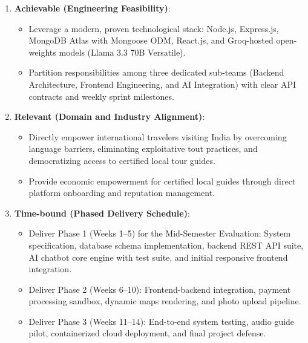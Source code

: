 \documentclass[12pt,a4paper,twoside,openright]{report}
\begin{document}
\begin{enumerate}[leftmargin=*]
    \item \textbf{Achievable (Engineering Feasibility)}:
    \begin{itemize}
        \item Leverage a modern, proven technological stack: Node.js, Express.js, MongoDB Atlas with Mongoose ODM, React.js, and Groq-hosted open-weights models (Llama 3.3 70B Versatile).
        \item Partition responsibilities among three dedicated sub-teams (Backend Architecture, Frontend Engineering, and AI Integration) with clear API contracts and weekly sprint milestones.
    \end{itemize}

    \item \textbf{Relevant (Domain and Industry Alignment)}:
    \begin{itemize}
        \item Directly empower international travelers visiting India by overcoming language barriers, eliminating exploitative tout practices, and democratizing access to certified local tour guides.
        \item Provide economic empowerment for certified local guides through direct platform onboarding and reputation management.
    \end{itemize}

    \item \textbf{Time-bound (Phased Delivery Schedule)}:
    \begin{itemize}
        \item Deliver Phase 1 (Weeks 1--5) for the Mid-Semester Evaluation: System specification, database schema implementation, backend REST API suite, AI chatbot core engine with test suite, and initial responsive frontend integration.
        \item Deliver Phase 2 (Weeks 6--10): Frontend-backend integration, payment processing sandbox, dynamic maps rendering, and photo upload pipeline.
        \item Deliver Phase 3 (Weeks 11--14): End-to-end system testing, audio guide pilot, containerized cloud deployment, and final project defense.
    \end{itemize}
\end{enumerate}

\cleardoublepage

\end{document}

